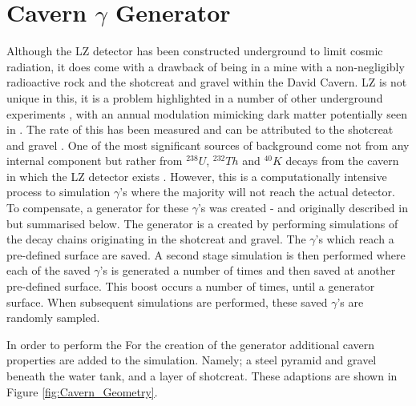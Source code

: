 \section{Cavern $\gamma$ Generator}
\label{sec:cavern_gamma_generator}

\par
Although the LZ detector has been constructed underground to limit cosmic radiation, it does come with a drawback of being in a mine with a non-negligibly radioactive rock and the shotcreat and gravel within the David Cavern.
LZ is not unique in this, it is a problem highlighted in a number of other underground experiments \cite{cavern_gamma_annual_modulation_CoGeNT_ref, cavern_gammas_in_Soudan_mine_ref}, with an annual modulation mimicking dark matter potentially seen in \cite{cavern_gamma_annual_modulation_CoGeNT_ref}.
The rate of this has been measured and can be attributed to the shotcreat and gravel \cite{LZ_Gamma_Ray_Background_ref}. 
One of the most significant sources of background come not from any internal component but rather from $^{238}U$, $^{232}Th$ and $^{40}K$ decays from the cavern in which the LZ detector exists \cite{LZ_Gamma_Ray_Background_ref}.
However, this is a computationally intensive process to simulation $\gamma$'s where the majority will not reach the actual detector.
To compensate, a generator for these $\gamma$'s was created - and originally described in \cite{rg_generator_ref} but summarised below.
The generator is a created by performing simulations of the decay chains originating in the shotcreat and gravel.
The $\gamma$'s which reach a pre-defined surface are saved.
A second stage simulation is then performed where each of the saved $\gamma$'s is generated a number of times and then saved at another pre-defined surface.
This boost occurs a number of times, until a generator surface.
When subsequent simulations are performed, these saved $\gamma$'s are randomly sampled. 

\par
In order to perform the For the creation of the generator additional cavern properties are added to the simulation.
Namely; a steel pyramid and gravel beneath the water tank, and a layer of shotcreat.
These adaptions are shown in Figure \ref{fig:Cavern_Geometry}.

